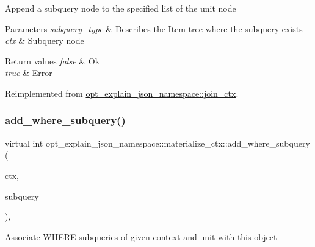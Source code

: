 Append a subquery node to the specified list of the unit node


\begin{DoxyParams}{Parameters}
{\em subquery\+\_\+type} & Describes the \mbox{\hyperlink{classItem}{Item}} tree where the subquery exists \\
\hline
{\em ctx} & Subquery node\\
\hline
\end{DoxyParams}

\begin{DoxyRetVals}{Return values}
{\em false} & Ok \\
\hline
{\em true} & Error \\
\hline
\end{DoxyRetVals}


Reimplemented from \mbox{\hyperlink{classopt__explain__json__namespace_1_1join__ctx_a5005892466618a6abcc3a5971c1d7433}{opt\+\_\+explain\+\_\+json\+\_\+namespace\+::join\+\_\+ctx}}.

\mbox{\label{classopt__explain__json__namespace_1_1materialize__ctx_ae6715f07cfd160747433ad80fd78deac}} 
\subsubsection{\texorpdfstring{add\+\_\+where\+\_\+subquery()}{add\_where\_subquery()}}
{\footnotesize\ttfamily virtual int opt\+\_\+explain\+\_\+json\+\_\+namespace\+::materialize\+\_\+ctx\+::add\+\_\+where\+\_\+subquery (\begin{DoxyParamCaption}\item[{\mbox{\hyperlink{classopt__explain__json__namespace_1_1subquery__ctx}{subquery\+\_\+ctx}} $\ast$}]{ctx,  }\item[{S\+E\+L\+E\+C\+T\+\_\+\+L\+E\+X\+\_\+\+U\+N\+IT $\ast$}]{subquery }\end{DoxyParamCaption})\hspace{0.3cm}{\ttfamily [inline]}, {\ttfamily [virtual]}}

Associate W\+H\+E\+RE subqueries of given context and unit with this object


